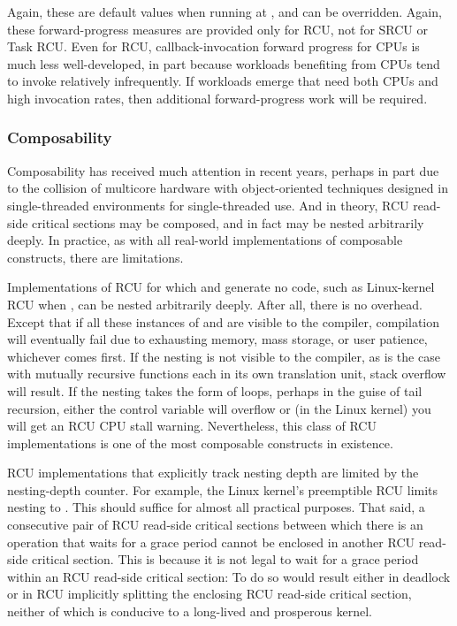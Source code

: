 Again, these are default values when running at , and can be
overridden.
Again, these forward-progress measures are provided only for
RCU, not for SRCU %
or Task RCU. %
Even for RCU, callback-invocation forward
progress for  CPUs is much less well-developed, in part
because workloads benefiting from  CPUs tend to invoke
 relatively infrequently.
If workloads emerge that need
both  CPUs and high  invocation rates, then
additional forward-progress work will be required.


\subsubsection{Composability}

Composability has received much attention in recent years, perhaps in
part due to the collision of multicore hardware with object-oriented
techniques designed in single-threaded environments for single-threaded
use.
And in theory, RCU read-side critical sections may be composed, and
in fact may be nested arbitrarily deeply.
In practice, as with all
real-world implementations of composable constructs, there are
limitations.

Implementations of RCU for which  and
 generate no code, such as Linux-kernel RCU when
, can be nested arbitrarily deeply.
After all, there
is no overhead. Except that if all these instances of
 and  are visible to the
compiler, compilation will eventually fail due to exhausting memory,
mass storage, or user patience, whichever comes first.
If the nesting is
not visible to the compiler, as is the case with mutually recursive
functions each in its own translation unit, stack overflow will result.
If the nesting takes the form of loops, perhaps in the guise of tail
recursion, either the control variable will overflow or (in the Linux
kernel) you will get an RCU CPU stall warning. Nevertheless, this class
of RCU implementations is one of the most composable constructs in
existence.

RCU implementations that explicitly track nesting depth are limited by
the nesting-depth counter.
For example, the Linux kernel's preemptible
RCU limits nesting to . This should suffice for almost all
practical purposes.
That said, a consecutive pair of RCU read-side
critical sections between which there is an operation that waits for a
grace period cannot be enclosed in another RCU read-side critical
section.
This is because it is not legal to wait for a grace period
within an RCU read-side critical section:
To do so would result either
in deadlock or in RCU implicitly splitting the enclosing RCU read-side
critical section, neither of which is conducive to a long-lived and
prosperous kernel.

